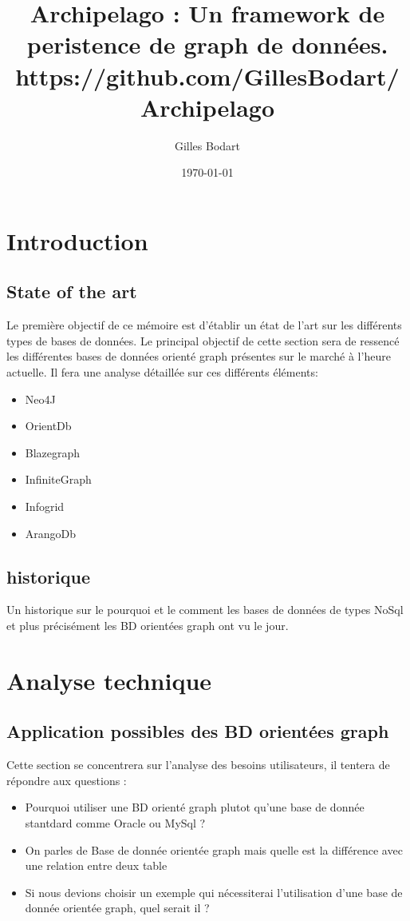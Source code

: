 \documentclass[a4paper,12pt,twoside, fleqn]{report}
\title{Archipelago : Un framework de peristence de graph de données. \\ https://github.com/GillesBodart/Archipelago}
\author{Gilles Bodart}
\date{\today}
\begin{document}
 	\maketitle
 	
\chapter{Introduction}
\section{State of the art}	
Le première objectif de ce mémoire est d'établir un état de l'art sur les différents types de bases de données. Le principal objectif de cette section sera de ressencé les différentes bases de données orienté graph présentes sur le marché à l'heure actuelle. Il fera une analyse détaillée sur ces différents éléments:
\begin{itemize}
\item Neo4J
\item OrientDb
\item Blazegraph
\item InfiniteGraph
\item Infogrid
\item ArangoDb
\end{itemize}
\section{historique}

Un historique sur le pourquoi et le comment les bases de données de types NoSql et plus précisément les BD orientées graph ont vu le jour.

\chapter{Analyse technique}
\section{Application possibles des BD orientées graph}
Cette section se concentrera sur l'analyse des besoins utilisateurs, il tentera de répondre aux questions : 
\begin{itemize}
\item Pourquoi utiliser une BD orienté graph plutot qu'une base de donnée stantdard comme Oracle ou MySql ?
\item On parles de Base de donnée orientée graph mais quelle est la différence avec une relation entre deux table
\item Si nous devions choisir un exemple qui nécessiterai l'utilisation d'une base de donnée orientée graph, quel serait il ?
\end{itemize}
\end{document}
